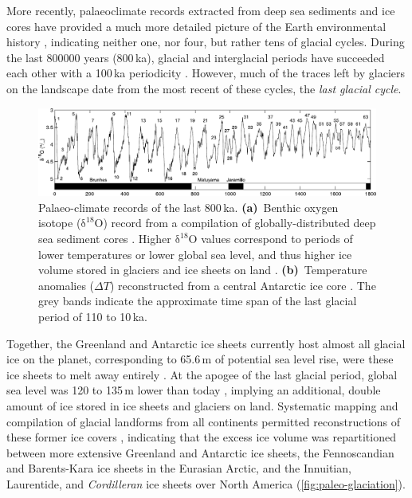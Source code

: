 \documentclass[a4paper]{kappa}
\newcommand{\chem}[1]{\ensuremath{\mathrm{#1}}}
\begin{document}
More recently, palaeoclimate records extracted from deep sea sediments and ice
cores have provided a much more detailed picture of the Earth environmental
history \citep[e.g.,][]{Emiliani.1955, Shackleton.Opdyke.1973,
Dansgaard.etal.1993, Augustin.etal.2004}, indicating neither one, nor four, but
rather tens of glacial cycles. During the last 800000 years (800\,ka), glacial
and interglacial periods have succeeded each other with a 100\,ka periodicity
\citep[\cref{fig:paleo-timeseries};][]{Hays.etal.1976, Augustin.etal.2004}.
However, much of the traces left by glaciers on the landscape date from the
most recent of these cycles, the \emph{last glacial cycle}.

\begin{figure}
  \includegraphics{paleo-timeseries}
  \caption{Palaeo-climate records of the last 800\,ka.
           \textbf{(a)}~Benthic oxygen isotope (\chem{\delta^{18}O}) record
           from a compilation of globally-distributed deep sea sediment cores
           \citep{Lisiecki.Raymo.2005}. Higher \chem{\delta^{18}O} values
           correspond to periods of lower temperatures \citep{Emiliani.1955}
           or lower global sea level, and thus higher ice volume stored in
           glaciers and ice sheets on land \citep{Shackleton.1967}.
           \textbf{(b)}~Temperature anomalies ($\Delta T$) reconstructed from a
           central Antarctic ice core \citep[EPICA Dome~C,][]{Jouzel.etal.2007}.
           The grey bands indicate the approximate time span of the last
           glacial period of 110 to 10\,ka.}
  \label{fig:paleo-timeseries}
\end{figure}

Together, the Greenland and Antarctic ice sheets currently host almost all
glacial ice on the planet, corresponding to 65.6\,m of potential sea level
rise, were these ice sheets to melt away entirely \citep{Bamber.etal.2013,
Fretwell.etal.2013}. At the apogee of the last glacial period, global sea level
was 120 to 135\,m lower than today
\citep{Clark.Mix.2002}, implying an additional, double amount of ice stored in
ice sheets and glaciers on land. Systematic mapping and compilation of glacial
landforms from all continents \citep[e.g.,][]{Prest.etal.1968,
Boulton.Clark.1990, Kleman.etal.1997, Hattestrand.1998} permitted
reconstructions of these former ice covers \citep{Ehlers.Gibbard.2007},
indicating that the excess ice volume
was repartitioned between more extensive Greenland and Antarctic ice sheets,
the Fennoscandian and Barents-Kara ice sheets in the Eurasian Arctic, and the
Innuitian, Laurentide, and \emph{Cordilleran} ice
sheets over North America (\cref{fig:paleo-glaciation}).
\end{document}
